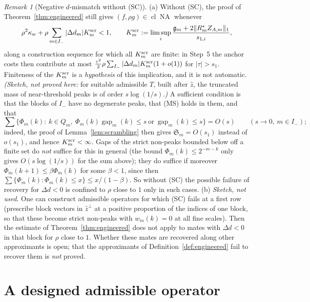\documentclass[10pt]{amsart}
\theoremstyle{definition}
\theoremstyle{remark}
\newtheorem{remark}[theorem]{Remark}
\newcommand{\NA}{\operatorname{NA}}
\newcommand{\cl}{\operatorname{cl}}
\newcommand{\gap}{\operatorname{gap}}
\newcommand{\zh}{\hat z}
\begin{document}
\begin{remark}[Negative $d$-mismatch without \textup{(SC)}]\label{rem:withoutSC}
(a) Without \textup{(SC)}, the proof of Theorem~\ref{thm:engineered} still
gives $(f,\rho g)\in\cl\NA$ whenever
\[
 \rho^2\kappa_w+\rho\sum_{m\in I_-}|\Delta d_m|K^{\rm scr}_m<1,\qquad
 K^{\rm scr}_m:=\limsup_i\frac{\mathfrak g_m+2\|R^*_mZ_{A,m}\|_1}{s_{1,i}},
\]
along a construction sequence for which all $K^{\rm scr}_m$ are finite: in
Step~5 the anchor costs then contribute at most
$\frac{\tau^2}2\rho\sum_{I_-}|\Delta d_m|K^{\rm scr}_m(1+o(1))$ for
$|\tau|>s_1$.  Finiteness of the $K^{\rm scr}_m$ is a \emph{hypothesis}
of this implication, and it is not automatic.  \emph{(Sketch, not proved
here:} for suitable admissible $T$, built after $\zh$, the truncated mass of
near-threshold peaks is of order $s\log(1/s)$.\emph{)}  A sufficient
condition is that the blocks of $I_-$ have no degenerate peaks, that
\textup{(MS)} holds in them, and that
\[
 \sum\big\{\Phi_m(k):\ k\in Q_m,\ \Phi_m(k)\gap_m(k)\le s\ \text{or}\
 \gap_m(k)\le s\big\}=O(s)\qquad(s\to0,\ m\in I_-);
\]
indeed, the proof of Lemma~\ref{lem:scrambling} then gives
$\mathfrak S_m=O(s_1)$ instead of $o(s_1)$, and hence
$K^{\rm scr}_m<\infty$.  Gaps of the strict non-peaks bounded below off a
finite set do \emph{not} suffice for this in general (the bound
$\Phi_m(k)\le2^{-m-k}$ only gives $O(s\log(1/s))$ for the sum above); they
do suffice if moreover $\Phi_m(k+1)\le\beta\Phi_m(k)$ for some $\beta<1$,
since then $\sum\{\Phi_m(k):\Phi_m(k)\le x\}\le x/(1-\beta)$.  So without
\textup{(SC)} the possible failure of recovery for $\Delta d<0$ is confined
to $\rho$ close to $1$ only in such cases.
(b) \emph{Sketch, not used.}  One can construct admissible operators for
which \textup{(SC)} fails at a first row (prescribe block vectors in
$\zh^\perp$ at a positive proportion of the indices of one block, so that
these become strict non-peaks with $w_m(k)=0$ at all fine scales).  Then the
estimate of Theorem~\ref{thm:engineered} does not apply to mates with
$\Delta d<0$ in that block for $\rho$ close to $1$.  Whether these mates are
recovered along other approximants is open; that the approximants of
Definition~\ref{def:engineered} fail to recover them is \emph{not} proved.
\end{remark}

\section{A designed admissible operator}\label{sec:designed}
\end{document}
